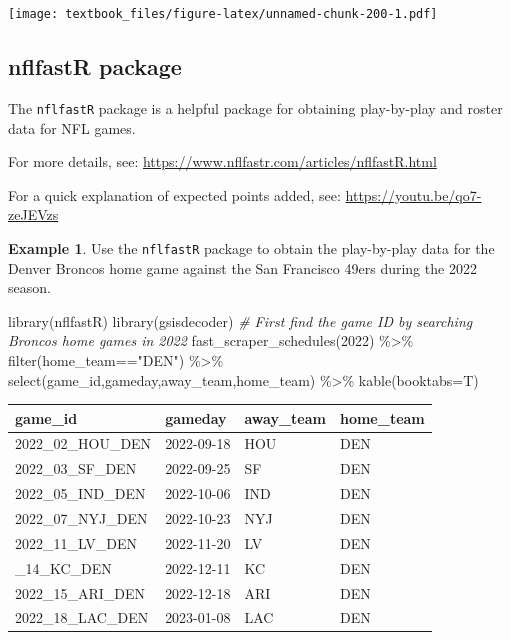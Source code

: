 \documentclass[
  11pt,
]{book}
\newenvironment{Shaded}{\begin{snugshade}}{\end{snugshade}}
\newcommand{\AttributeTok}[1]{\textcolor[rgb]{0.77,0.63,0.00}{#1}}
\newcommand{\CommentTok}[1]{\textcolor[rgb]{0.56,0.35,0.01}{\textit{#1}}}
\newcommand{\DecValTok}[1]{\textcolor[rgb]{0.00,0.00,0.81}{#1}}
\newcommand{\FunctionTok}[1]{\textcolor[rgb]{0.00,0.00,0.00}{#1}}
\newcommand{\NormalTok}[1]{#1}
\newcommand{\SpecialCharTok}[1]{\textcolor[rgb]{0.00,0.00,0.00}{#1}}
\newcommand{\StringTok}[1]{\textcolor[rgb]{0.31,0.60,0.02}{#1}}
\theoremstyle{definition}
\theoremstyle{definition}
\newtheorem{example}{Example}[chapter]
\theoremstyle{definition}
\theoremstyle{definition}
\theoremstyle{remark}
\begin{document}
\texttt{[image: textbook\_files/figure-latex/unnamed-chunk-200-1.pdf]}

\newpage

\hypertarget{nflfastr-package}{%
\subsection{nflfastR package}\label{nflfastr-package}}

The \texttt{nflfastR} package is a helpful package for obtaining play-by-play and roster data for NFL games.

For more details, see: \url{https://www.nflfastr.com/articles/nflfastR.html}

For a quick explanation of expected points added, see: \url{https://youtu.be/qo7-zeJEVzs}

\begin{example}
Use the \texttt{nflfastR} package to obtain the play-by-play data for the Denver Broncos home game against the San Francisco 49ers during the 2022 season.
\end{example}

\begin{Shaded}
\begin{Highlighting}[]
\FunctionTok{library}\NormalTok{(nflfastR)}
\FunctionTok{library}\NormalTok{(gsisdecoder)}
\CommentTok{\# First find the game ID by searching Broncos home games in 2022}
\FunctionTok{fast\_scraper\_schedules}\NormalTok{(}\DecValTok{2022}\NormalTok{) }\SpecialCharTok{\%\textgreater{}\%}
  \FunctionTok{filter}\NormalTok{(home\_team}\SpecialCharTok{==}\StringTok{"DEN"}\NormalTok{) }\SpecialCharTok{\%\textgreater{}\%}
  \FunctionTok{select}\NormalTok{(game\_id,gameday,away\_team,home\_team) }\SpecialCharTok{\%\textgreater{}\%}
  \FunctionTok{kable}\NormalTok{(}\AttributeTok{booktabs=}\NormalTok{T)}
\end{Highlighting}
\end{Shaded}

\begin{tabular}{llll}
\toprule
game\_id & gameday & away\_team & home\_team\\
\midrule
2022\_02\_HOU\_DEN & 2022-09-18 & HOU & DEN\\
2022\_03\_SF\_DEN & 2022-09-25 & SF & DEN\\
2022\_05\_IND\_DEN & 2022-10-06 & IND & DEN\\
2022\_07\_NYJ\_DEN & 2022-10-23 & NYJ & DEN\\
2022\_11\_LV\_DEN & 2022-11-20 & LV & DEN\\
\addlinespace
2022\_14\_KC\_DEN & 2022-12-11 & KC & DEN\\
2022\_15\_ARI\_DEN & 2022-12-18 & ARI & DEN\\
2022\_18\_LAC\_DEN & 2023-01-08 & LAC & DEN\\
\bottomrule
\end{tabular}
\end{document}
